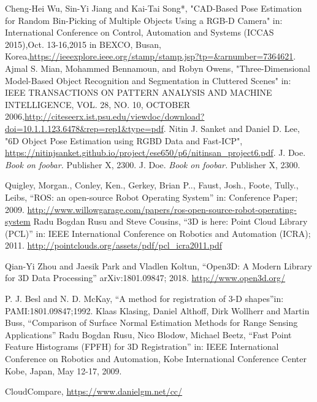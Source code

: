 \begin{thebibliography}{1}
		Cheng-Hei Wu, Sin-Yi Jiang and Kai-Tai Song*,
		"CAD-Based Pose Estimation for Random Bin-Picking of Multiple Objects Using a RGB-D Camera" in: International Conference on Control, Automation and Systems (ICCAS 2015),Oct. 13-16,2015 in BEXCO, Busan, Korea,\url{https://ieeexplore.ieee.org/stamp/stamp.jsp?tp=&arnumber=7364621}.
		Ajmal S. Mian, Mohammed Bennamoun, and Robyn Owens,
		"Three-Dimensional Model-Based Object Recognition and Segmentation in Cluttered Scenes" in: IEEE TRANSACTIONS ON PATTERN ANALYSIS AND MACHINE INTELLIGENCE,  VOL. 28,  NO. 10,  OCTOBER 2006,\url{http://citeseerx.ist.psu.edu/viewdoc/download?doi=10.1.1.123.6478&rep=rep1&type=pdf}.
		Nitin J. Sanket and Daniel D. Lee,
		"6D  Object  Pose  Estimation  using  RGBD  Data  and  Fast-ICP", \url{https://nitinjsanket.github.io/project/ese650/p6/nitinsan_project6.pdf}.
	 J. Doe. \emph{Book on foobar.} Publisher X,
	2300.
	 J. Doe. \emph{Book on foobar.} Publisher X,
	2300.

		Quigley, Morgan., Conley, Ken., Gerkey, Brian P.., Faust, Josh., Foote, Tully., Leibs,
		``ROS: an open-source Robot Operating System'' in: Conference Paper; 2009. \url{http://www.willowgarage.com/papers/ros-open-source-robot-operating-system}	
		Radu Bogdan Rusu and Steve Cousins,
		``3D is here: Point Cloud Library (PCL)'' in: IEEE International Conference on Robotics and Automation (ICRA); 2011. \url{http://pointclouds.org/assets/pdf/pcl_icra2011.pdf}
	
	Qian-Yi Zhou and Jaesik Park and Vladlen Koltun,
	``{Open3D}: {A} Modern Library for {3D} Data Processing'' arXiv:1801.09847; 2018. \url{http://www.open3d.org/}

		P. J. Besl and N. D. McKay,
		``A method for registration of 3-D shapes''in: PAMI:1801.09847;1992.
		Klaas Klasing, Daniel Althoff, Dirk Wollherr and Martin Buss,
		``Comparison of  Surface Normal Estimation  Methods for Range Sensing Applications'' 
		Radu Bogdan Rusu, Nico Blodow, Michael Beetz,
		``Fast Point Feature Histograms (FPFH) for 3D Registration'' in: IEEE International Conference on Robotics and Automation, Kobe International Conference Center Kobe, Japan, May 12-17, 2009.
		
		CloudCompare,
		\url{https://www.danielgm.net/cc/}


\end{thebibliography}
